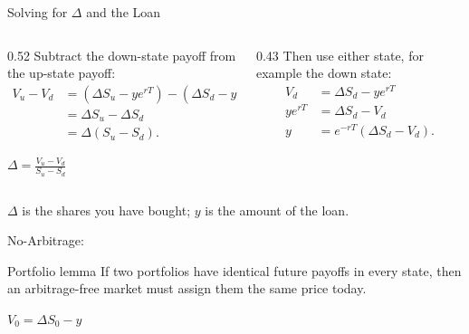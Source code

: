 \documentclass[aspectratio=169,10pt]{beamer}
\begin{document}
\begin{frame}{Solving for $\Delta$ and the Loan}
  \small
  \begin{columns}[T,onlytextwidth]
    \begin{column}{0.52\textwidth}
      Subtract the down-state payoff from the up-state payoff:
      \begin{align*}
        V_u-V_d
          &= (\Delta S_u-ye^{rT})-(\Delta S_d-ye^{rT})\\
          &= \Delta S_u-\Delta S_d\\
          &= \Delta(S_u-S_d).
      \end{align*}
      \begin{center}
        $\displaystyle \Delta=\frac{V_u-V_d}{S_u-S_d}$
      \end{center}
    \end{column}
    \begin{column}{0.43\textwidth}
      Then use either state, for example the down state:
      \begin{align*}
        V_d&=\Delta S_d-ye^{rT}\\
        ye^{rT}&=\Delta S_d-V_d\\
        y&=e^{-rT}(\Delta S_d-V_d).
      \end{align*}
    \end{column}
  \end{columns}
  \vspace{0.15cm}
  \centering $\Delta$ is the shares you have bought; $y$ is the amount of the loan.
\end{frame}

\begin{frame}{No-Arbitrage:}
  \begin{block}{Portfolio lemma}
    If two portfolios have identical future payoffs in every state, then an arbitrage-free market must assign them the same price today.
  \end{block}
  \vspace{0.25cm}
  \begin{center}
    \Large $\displaystyle V_0 = \Delta S_0-y$
  \end{center}
\end{frame}
\end{document}
